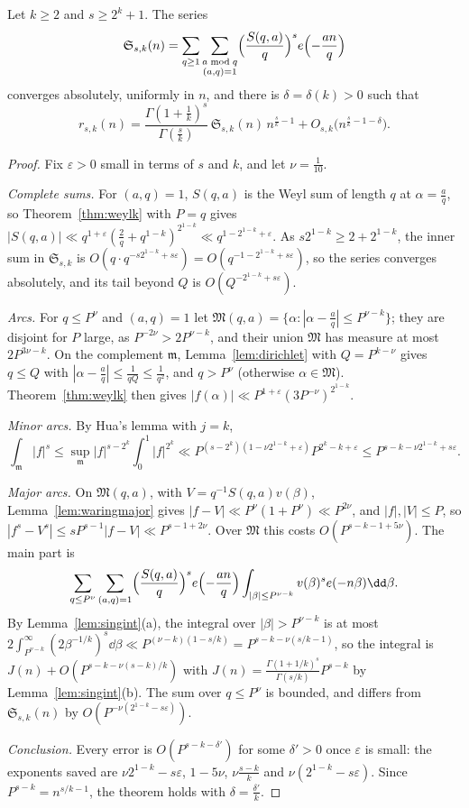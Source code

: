 \begin{theorem}\label{thm:waring}
Let $k\ge2$ and $s\ge2^k+1$. The series
\[
\mathfrak S_{s,k}(n)=\sum_{q\ge1}\sum_{\substack{a\bmod q\\(a,q)=1}}\Bigl(\frac{S(q,a)}q\Bigr)^se\Bigl(-\frac{an}q\Bigr)
\]
converges absolutely, uniformly in $n$, and there is $\delta=\delta(k)>0$ such that
\[
r_{s,k}(n)=\frac{\Gamma(1+\frac1k)^s}{\Gamma(\frac sk)}\,\mathfrak S_{s,k}(n)\,n^{\frac sk-1}+O_{s,k}\bigl(n^{\frac sk-1-\delta}\bigr).
\]
\end{theorem}
\begin{proof}
Fix $\varepsilon>0$ small in terms of $s$ and $k$, and let $\nu=\frac1{10}$.

\emph{Complete sums.} For $(a,q)=1$, $S(q,a)$ is the Weyl sum of length $q$ at $\alpha=\frac aq$, so Theorem~\ref{thm:weylk} with $P=q$ gives $|S(q,a)|\ll q^{1+\varepsilon}(\frac2q+q^{1-k})^{2^{1-k}}\ll q^{1-2^{1-k}+\varepsilon}$. As $s2^{1-k}\ge2+2^{1-k}$, the inner sum in $\mathfrak S_{s,k}$ is $O(q\cdot q^{-s2^{1-k}+s\varepsilon})=O(q^{-1-2^{1-k}+s\varepsilon})$, so the series converges absolutely, and its tail beyond $Q$ is $O(Q^{-2^{1-k}+s\varepsilon})$.

\emph{Arcs.} For $q\le P^\nu$ and $(a,q)=1$ let $\mathfrak M(q,a)=\{\alpha:|\alpha-\frac aq|\le P^{\nu-k}\}$; they are disjoint for $P$ large, as $P^{-2\nu}>2P^{\nu-k}$, and their union $\mathfrak M$ has measure at most $2P^{3\nu-k}$. On the complement $\mathfrak m$, Lemma~\ref{lem:dirichlet} with $Q=P^{k-\nu}$ gives $q\le Q$ with $|\alpha-\frac aq|\le\frac1{qQ}\le\frac1{q^2}$, and $q>P^\nu$ (otherwise $\alpha\in\mathfrak M$). Theorem~\ref{thm:weylk} then gives $|f(\alpha)|\ll P^{1+\varepsilon}(3P^{-\nu})^{2^{1-k}}$.

\emph{Minor arcs.} By Hua's lemma with $j=k$,
\[
\int_{\mathfrak m}|f|^s\le\sup_{\mathfrak m}|f|^{s-2^k}\int_0^1|f|^{2^k}\ll P^{(s-2^k)(1-\nu2^{1-k}+\varepsilon)}P^{2^k-k+\varepsilon}\le P^{s-k-\nu2^{1-k}+s\varepsilon}.
\]

\emph{Major arcs.} On $\mathfrak M(q,a)$, with $V=q^{-1}S(q,a)v(\beta)$, Lemma~\ref{lem:waringmajor} gives $|f-V|\ll P^\nu(1+P^\nu)\ll P^{2\nu}$, and $|f|,|V|\le P$, so $|f^s-V^s|\le sP^{s-1}|f-V|\ll P^{s-1+2\nu}$. Over $\mathfrak M$ this costs $O(P^{s-k-1+5\nu})$. The main part is
\[
\sum_{q\le P^\nu}\sum_{(a,q)=1}\Bigl(\frac{S(q,a)}q\Bigr)^se\Bigl(-\frac{an}q\Bigr)\int_{|\beta|\le P^{\nu-k}}v(\beta)^se(-n\beta)\dd\beta.
\]
By Lemma~\ref{lem:singint}(a), the integral over $|\beta|>P^{\nu-k}$ is at most $2\int_{P^{\nu-k}}^\infty(2\beta^{-1/k})^s\dd\beta\ll P^{(\nu-k)(1-s/k)}=P^{s-k-\nu(s/k-1)}$, so the integral is $J(n)+O(P^{s-k-\nu(s-k)/k})$ with $J(n)=\frac{\Gamma(1+1/k)^s}{\Gamma(s/k)}P^{s-k}$ by Lemma~\ref{lem:singint}(b). The sum over $q\le P^\nu$ is bounded, and differs from $\mathfrak S_{s,k}(n)$ by $O(P^{-\nu(2^{1-k}-s\varepsilon)})$.

\emph{Conclusion.} Every error is $O(P^{s-k-\delta'})$ for some $\delta'>0$ once $\varepsilon$ is small: the exponents saved are $\nu2^{1-k}-s\varepsilon$, $1-5\nu$, $\nu\frac{s-k}k$ and $\nu(2^{1-k}-s\varepsilon)$. Since $P^{s-k}=n^{s/k-1}$, the theorem holds with $\delta=\frac{\delta'}k$.
\end{proof}

